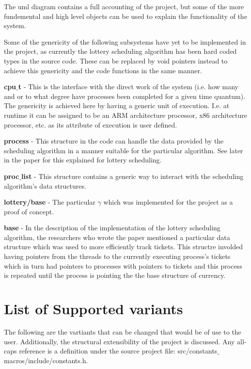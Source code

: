 \documentclass[acmsmall]{acmart}
\newcommand{\csfont}[1]{\fontfamily{cmtt}\selectfont #1}
\begin{document}
\begin{multicols}{2}
    The uml diagram contains a full accounting of the project, but some of the
    more fundemental and high level objects can be used to explain the
    functionality of the system.
    \par
    Some of the  genericity of the following subsystems have yet to be
    implemented in the project, as currently the lottery scheduling algorithm
    has been hard coded types in the source code.  These can be replaced by void
    pointers instead to achieve this genericity and the code functions in the
    same manner.
    \par
    \textbf{cpu$\_$t} - This is the interface with the direct work of the system
    (i.e. how many and or to what degree have processes been completed for a
    given time quantum). The genericity is achieved here by having a generic
    unit of execution. I.e. at runtime it can be assigned to be an ARM
    architecture processor, x86 architecture processor, etc. as its attribute of
    execution is user defined.
    \par
    \textbf{process} - This structure in the code can handle the data provided
    by the scheduling algorithm in a manner suitable for the particular
    algorithm. See later in the paper for this explained for lottery scheduling.
    \par
    \textbf{proc$\_$list} - This structure contains a generic way to
    interact with the scheduling algorithm's data structures.
    \par
    \textbf{lottery/base} - The particular $\gamma$ which was implemented for
    the project as a proof of concept.
    \par
    \textbf{base} - In the description of the implementation of the lottery
    scheduling algorithm, the researchers who wrote the paper mentioned a
    particular data structure which was used to more efficiently track tickets.
    This structre involded having pointers from the threads to the currently
    executing process's tickets which in turn had pointers to processes with
    pointers to tickets and this process is repeated until the process is
    pointing the the base structure of currency.
    \par

\section{List of Supported variants}
  The following are the vartiants that can be changed that would be of use to
  the user. Additionally, the structural extensibility of the project is
  discussed. Any all-caps reference is a definition under the source project
  file: {\csfont{src/constants$\_$macros/include/constants.h}}.

\end{multicols}
\end{document}
